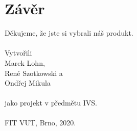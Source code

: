 \documentclass[a4paper, 11pt]{article}
\begin{document}
\section{Závěr}

Děkujeme, že jste si vybrali náš produkt.\\
\\
\noindent
Vytvořili\\Marek Lohn,\\René Szotkowski a\\Ondřej Mikula\\\\jako projekt v předmětu IVS.\\\\
FIT VUT, Brno, 2020.
\end{document}
